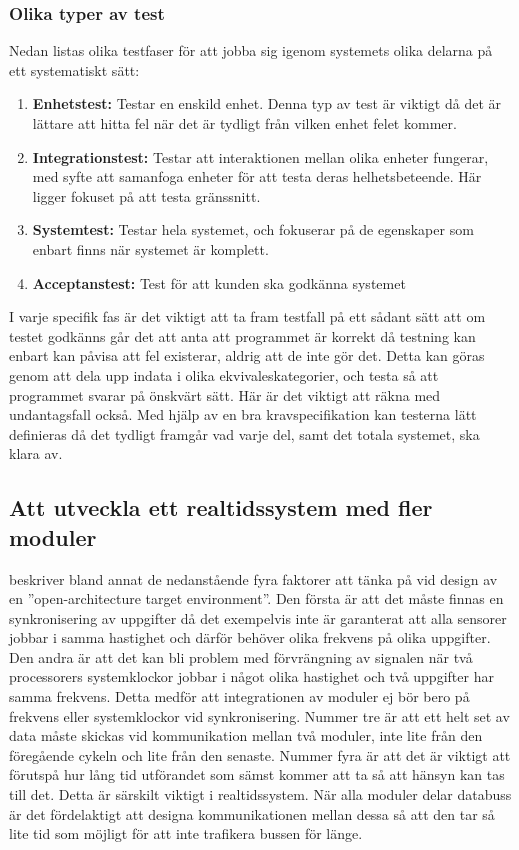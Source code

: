 \documentclass[11pt]{article}
\begin{document}
\begin{flushleft}
\subsubsection{Olika typer av test}
Nedan listas olika testfaser för att jobba sig igenom systemets olika delarna på ett systematiskt sätt:
\begin{enumerate}
	\item \textbf{Enhetstest:} Testar en enskild enhet. Denna typ av test är viktigt då det är lättare att hitta fel när det är tydligt från vilken enhet felet kommer.
	\item \textbf{Integrationstest:} Testar att interaktionen mellan olika enheter fungerar, med syfte att samanfoga enheter för att testa deras helhetsbeteende. Här ligger fokuset på att testa gränssnitt.
	\item \textbf{Systemtest:} Testar hela systemet, och fokuserar på de egenskaper som enbart finns när systemet är komplett.
	\item \textbf{Acceptanstest:} Test för att kunden ska godkänna systemet  
\end{enumerate}

I varje specifik fas är det viktigt att ta fram testfall på ett sådant sätt att om testet godkänns går det att anta att programmet är korrekt då testning kan enbart kan påvisa att fel existerar, aldrig att de inte gör det. Detta kan göras genom att dela upp indata i olika ekvivaleskategorier, och testa så att programmet svarar på önskvärt sätt. Här är det viktigt att räkna med undantagsfall också.\cite{tester} Med hjälp av en bra kravspecifikation kan testerna lätt definieras då det tydligt framgår vad varje del, samt det totala systemet, ska klara av. 

\subsection{Att utveckla ett realtidssystem med fler moduler}

\cite{IRS} beskriver bland annat de nedanstående fyra faktorer att tänka på vid design av en ''open-architecture target environment''. Den första är att det måste finnas en synkronisering av uppgifter då det exempelvis inte är garanterat att alla sensorer jobbar i samma hastighet och därför behöver olika frekvens på olika uppgifter. Den andra är att det kan bli problem med förvrängning av signalen när två processorers systemklockor jobbar i något olika hastighet och två uppgifter har samma frekvens. Detta medför att integrationen av moduler ej bör bero på frekvens eller systemklockor vid synkronisering. Nummer tre är att ett helt set av data måste skickas vid kommunikation mellan två moduler, inte lite från den föregående cykeln och lite från den senaste. Nummer fyra är att det är viktigt att förutspå hur lång tid utförandet som sämst kommer att ta så att hänsyn kan tas till det. Detta är särskilt viktigt i realtidssystem. När alla moduler delar databuss är det fördelaktigt att designa kommunikationen mellan dessa så att den tar så lite tid som möjligt för att inte trafikera bussen för länge.   


\end{flushleft}
\end{document}
